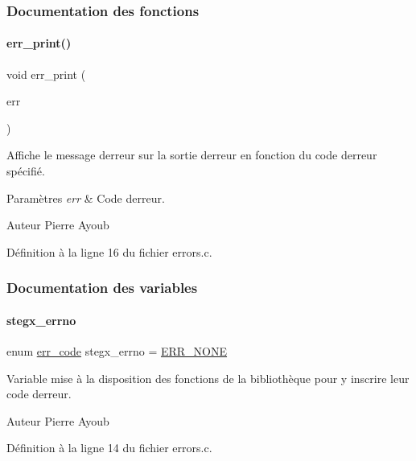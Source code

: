 \subsubsection{Documentation des fonctions}
\mbox{\label{a00062_a4e64579b7bb7e4cbc62af850504b6c36}} 
\paragraph{\texorpdfstring{err\+\_\+print()}{err\_print()}}
{\footnotesize\ttfamily void err\+\_\+print (\begin{DoxyParamCaption}\item[{const enum \hyperlink{a00011_a08b18ac8af0f3462354240d9732f3852}{err\+\_\+code}}]{err }\end{DoxyParamCaption})}

Affiche le message d\textquotesingle{}erreur sur la sortie d\textquotesingle{}erreur en fonction du code d\textquotesingle{}erreur spécifié. 
\begin{DoxyParams}{Paramètres}
{\em err} & Code d\textquotesingle{}erreur. \\
\hline
\end{DoxyParams}
\begin{DoxyAuthor}{Auteur}
Pierre Ayoub 
\end{DoxyAuthor}


Définition à la ligne 16 du fichier errors.\+c.



\subsubsection{Documentation des variables}
\mbox{\label{a00062_a5ec48ccdfbe19fe23855818f8556abec}} 
\paragraph{\texorpdfstring{stegx\+\_\+errno}{stegx\_errno}}
{\footnotesize\ttfamily enum \hyperlink{a00011_a08b18ac8af0f3462354240d9732f3852}{err\+\_\+code} stegx\+\_\+errno = \hyperlink{a00011_a08b18ac8af0f3462354240d9732f3852a5203071ca85e00df6bf2526855b6df0d}{E\+R\+R\+\_\+\+N\+O\+NE}}

Variable mise à la disposition des fonctions de la bibliothèque pour y inscrire leur code d\textquotesingle{}erreur. \begin{DoxyAuthor}{Auteur}
Pierre Ayoub 
\end{DoxyAuthor}


Définition à la ligne 14 du fichier errors.\+c.

